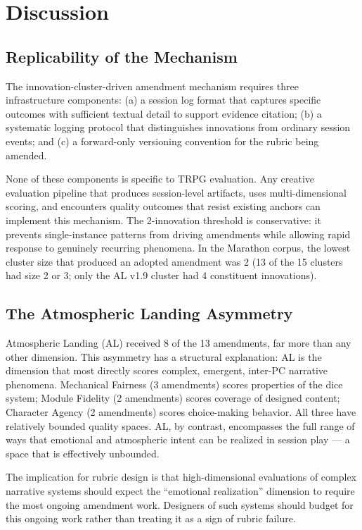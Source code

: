 
\section{Discussion}
\label{sec:discussion}

\subsection{Replicability of the Mechanism}

The innovation-cluster-driven amendment mechanism requires three infrastructure components:
(a) a session log format that captures specific outcomes with sufficient textual detail
to support evidence citation; (b) a systematic logging protocol that distinguishes
innovations from ordinary session events; and (c) a forward-only versioning convention
for the rubric being amended.

None of these components is specific to TRPG evaluation. Any creative evaluation
pipeline that produces session-level artifacts, uses multi-dimensional scoring, and
encounters quality outcomes that resist existing anchors can implement this mechanism.
The 2-innovation threshold is conservative: it prevents single-instance patterns from
driving amendments while allowing rapid response to genuinely recurring phenomena.
In the Marathon corpus, the lowest cluster size that produced an adopted amendment
was 2 (13 of the 15 clusters had size 2 or 3; only the AL v1.9 cluster had 4
constituent innovations).

\subsection{The Atmospheric Landing Asymmetry}

Atmospheric Landing (AL) received 8 of the 13 amendments, far more than any other
dimension. This asymmetry has a structural explanation: AL is the dimension that most
directly scores complex, emergent, inter-PC narrative phenomena. Mechanical Fairness
(3 amendments) scores properties of the dice system; Module Fidelity (2 amendments)
scores coverage of designed content; Character Agency (2 amendments) scores
choice-making behavior. All three have relatively bounded quality spaces. AL, by
contrast, encompasses the full range of ways that emotional and atmospheric intent
can be realized in session play --- a space that is effectively unbounded.

The implication for rubric design is that high-dimensional evaluations of complex
narrative systems should expect the ``emotional realization'' dimension to require
the most ongoing amendment work. Designers of such systems should budget for this
ongoing work rather than treating it as a sign of rubric failure.


